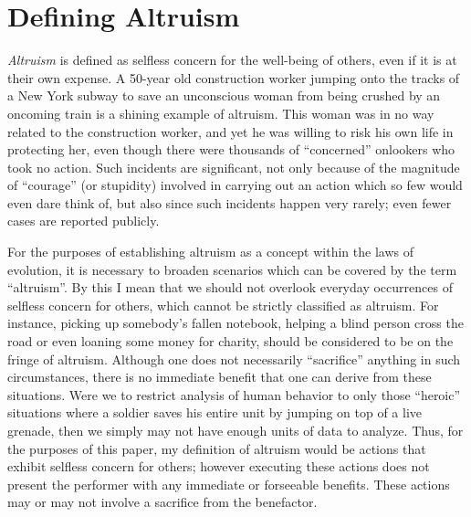 \documentclass[12pt, letter]{article}
\begin{document}
\section*{Defining Altruism}
\emph{Altruism} is defined as selfless concern for the well-being of others, even if it is at their own expense. A 50-year old construction worker jumping onto the tracks of a New York subway to save an unconscious woman from being crushed by an oncoming train is a shining example of altruism. This woman was in no way related to the construction worker, and yet he was willing to risk his own life in protecting her, even though there were thousands of ``concerned'' onlookers who took no action. Such incidents are significant, not only because of the magnitude of ``courage'' (or stupidity) involved in carrying out an action which so few would even dare think of, but also since such incidents happen very rarely; even fewer cases are reported publicly.

For the purposes of establishing altruism as a concept within the laws of evolution, it is necessary to broaden scenarios which can be covered by the term ``altruism''. By this I mean that we should not overlook everyday occurrences of selfless concern for others, which cannot be strictly classified as altruism. For instance, picking up somebody's fallen notebook, helping a blind person cross the road or even loaning some money for charity, should be considered to be on the fringe of altruism. Although one does not necessarily ``sacrifice'' anything in such circumstances, there is no immediate benefit that one can derive from these situations. Were we to restrict analysis of human behavior to only those ``heroic'' situations where a soldier saves his entire unit by jumping on top of a live grenade, then we simply may not have enough units of data to analyze. Thus, for the purposes of this paper, my definition of altruism would be actions that exhibit selfless concern for others; however executing these actions does not present the performer with any immediate or forseeable benefits. These actions may or may not involve a sacrifice from the benefactor.






	

\end{document}
